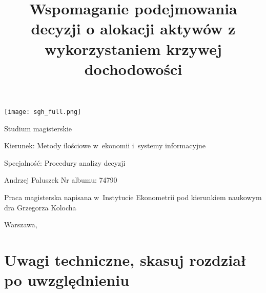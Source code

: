 \documentclass[12pt,a4paper,twoside,openany]{book}
\begin{document}
\begin{center}
\texttt{[image: sgh\_full.png]}

\vspace{1cm}

Studium magisterskie
\end{center}

\vspace{1cm}

\noindent Kierunek: Metody ilościowe w~ekonomii i~systemy informacyjne

\noindent Specjalność: Procedury analizy decyzji

\vspace{1cm}

{
\leftskip=10cm\noindent
Andrzej Paluszek\newline
Nr albumu: 74790

}

\vspace{2cm}

\title{Wspomaganie podejmowania decyzji o alokacji aktywów z wykorzystaniem krzywej dochodowości}
\makeatletter

\begin{center}
\LARGE\bf
\todo[inline]{\@title}
\end{center}

\vspace{2cm}

{
\leftskip=10cm\noindent
Praca magisterska\newline 
napisana w~Instytucie Ekonometrii\newline
pod kierunkiem naukowym\newline
dra Grzegorza Kolocha

}

\vfill

\begin{center}
Warszawa, \the\year
\end{center}
\thispagestyle{empty}

\clearpage
\thispagestyle{empty}
\mbox{}
\clearpage

\tableofcontents

\clearpage

\chapter*{Uwagi techniczne, skasuj rozdział po uwzględnieniu}
\end{document}
